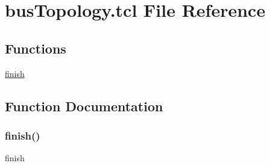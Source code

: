 \hypertarget{bus_topology_8tcl}{}\section{bus\+Topology.\+tcl File Reference}
\label{bus_topology_8tcl}
\subsection*{Functions}
\begin{DoxyCompactItemize}
\item 
\hyperlink{bus_topology_8tcl_a30728837c246b65ef76298af0101d99c}{finish}
\end{DoxyCompactItemize}


\subsection{Function Documentation}
\mbox{\label{bus_topology_8tcl_a30728837c246b65ef76298af0101d99c}} 
\subsubsection{\texorpdfstring{finish()}{finish()}}
{\footnotesize\ttfamily finish}


